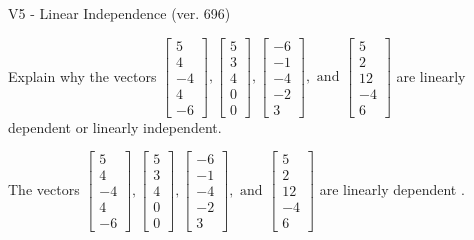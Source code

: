 \begin{exercise}
  \begin{exerciseTitle}V5 - Linear Independence (ver. 696)\end{exerciseTitle}
  \begin{exerciseStatement}
    Explain why the vectors \(\left[\begin{array}{r}
5 \\
4 \\
-4 \\
4 \\
-6
\end{array}\right] , \left[\begin{array}{r}
5 \\
3 \\
4 \\
0 \\
0
\end{array}\right] , \left[\begin{array}{r}
-6 \\
-1 \\
-4 \\
-2 \\
3
\end{array}\right] , \text{ and } \left[\begin{array}{r}
5 \\
2 \\
12 \\
-4 \\
6
\end{array}\right]\) are linearly dependent or linearly independent.	


  \end{exerciseStatement}
  \begin{exerciseAnswer}
   The vectors \(\left[\begin{array}{r}
5 \\
4 \\
-4 \\
4 \\
-6
\end{array}\right] , \left[\begin{array}{r}
5 \\
3 \\
4 \\
0 \\
0
\end{array}\right] , \left[\begin{array}{r}
-6 \\
-1 \\
-4 \\
-2 \\
3
\end{array}\right] , \text{ and } \left[\begin{array}{r}
5 \\
2 \\
12 \\
-4 \\
6
\end{array}\right]\) are 
  	 linearly dependent  .
  


  \end{exerciseAnswer}
\end{exercise}